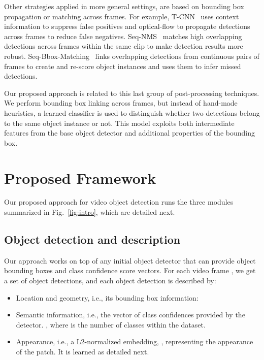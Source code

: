 \documentclass[letterpaper, 10 pt, conference]{ieeeconf}
\begin{document}
Other strategies applied in more general settings, are based on bounding box propagation or matching across frames. For example, T-CNN~\cite{TCNN} uses context information to suppress false positives and optical-flow to propagate detections across frames to reduce false negatives. 
Seq-NMS~\cite{SEQ-NMS} matches high overlapping detections across frames within the same clip to make detection results more robust. 
Seq-Bbox-Matching~\cite{SEQ-BBOX:VISIGRAPP} links overlapping detections from continuous pairs of frames to create and re-score object instances and uses them to infer missed detections.


Our proposed approach is related to this last group of post-processing techniques. We perform bounding box linking across frames, but instead of hand-made heuristics, a learned classifier is used to distinguish whether two detections belong to the same object instance or not. This model exploits both intermediate features from the base object detector and additional properties of the bounding box. 




\section{Proposed Framework}




















Our proposed approach for video object detection runs the three modules summarized in Fig.~\ref{fig:intro}, which are detailed next.

\subsection{Object detection and description}
\label{sec:det_and_descr}


Our approach works on top of any initial object detector that can provide object bounding boxes and class confidence score vectors. For each video frame , we get a set of object detections, 
and each object detection  is described by:
\begin{itemize}
    \item Location and geometry, i.e., its bounding box information: 


    \item Semantic information, i.e., the vector of class confidences  provided by the detector. , where  is the number of classes within the dataset.

    \item Appearance, i.e., a L2-normalized embedding, , representing the appearance of the patch. It is learned as detailed next. 
\end{itemize}
\end{document}
